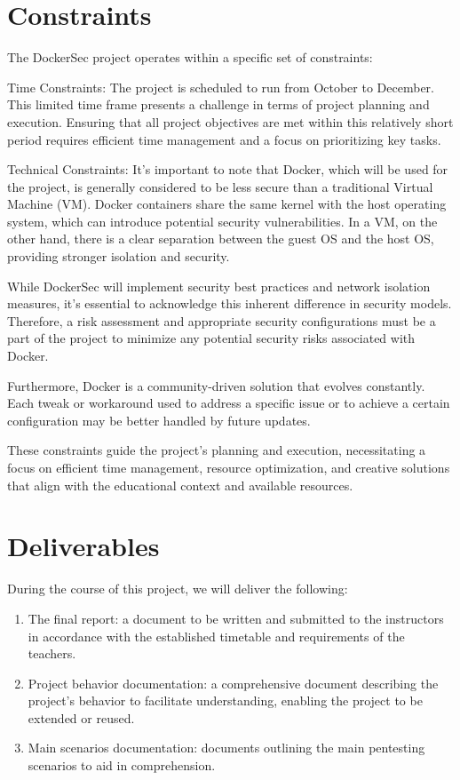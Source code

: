 \documentclass[a4paper,11pt,singlespacing]{article}
\begin{document}
\section{Constraints}
The DockerSec project operates within a specific set of constraints:\par
Time Constraints: The project is scheduled to run from October to December. This limited time frame presents a challenge in terms of project planning and execution. Ensuring that all project objectives are met within this relatively short period requires efficient time management and a focus on prioritizing key tasks.\par
Technical Constraints: It's important to note that Docker, which will be used for the project, is generally considered to be less secure than a traditional Virtual Machine (VM).
Docker containers share the same kernel with the host operating system, which can introduce potential security vulnerabilities. In a VM, on the other hand, there is a clear separation between the guest OS and the host OS, providing stronger isolation and security.\par
While DockerSec will implement security best practices and network isolation measures, it's essential to acknowledge this inherent difference in security models. Therefore, a risk assessment and appropriate security configurations must be a part of the project to minimize any potential security risks associated with Docker.\par
Furthermore, Docker is a community-driven solution that evolves constantly. Each tweak or workaround used to address a specific issue or to achieve a certain configuration may be better handled by future updates.\par
These constraints guide the project's planning and execution, necessitating a focus on efficient time management, resource optimization, and creative solutions that align with the educational context and available resources.\par

\section{Deliverables}
During the course of this project, we will deliver the following:

\begin{enumerate}
    \item The final report: a document to be written and submitted to the instructors in accordance with the established timetable and requirements of the teachers.
    
    \item Project behavior documentation: a comprehensive document describing the project's behavior to facilitate understanding, enabling the project to be extended or reused.
    
    \item Main scenarios documentation: documents outlining the main pentesting scenarios to aid in comprehension.
\end{enumerate}
\end{document}
